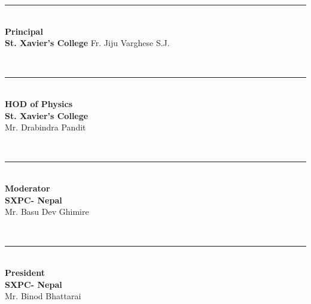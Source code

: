 \documentclass[a4paper,10pt]{article}
\begin{document}
\vspace{2.8cm}

\begin{center}

\begin{minipage}{0.2\textwidth}
\begin{flushleft}
\rule{3.3cm}{0.4pt} \\[0.5cm]
\textbf{Principal}\\
\textbf{St. Xavier's College}
Fr. Jiju Varghese S.J.
\end{flushleft}
\end{minipage}
~
\begin{minipage}{0.2\textwidth}
\begin{flushleft}
\rule{3.3cm}{0.4pt} \\[0.5cm]
\textbf{HOD of Physics}\\
\textbf{St. Xavier's College}\\
Mr. Drabindra Pandit
\end{flushleft}
\end{minipage}
~
\begin{minipage}{0.21\textwidth}
\begin{flushleft}
\rule{3.4cm}{0.4pt} \\[0.5cm]
\textbf{Moderator}\\
\textbf{SXPC- Nepal}\\
Mr. Basu Dev Ghimire
\end{flushleft}
\end{minipage}
~
\begin{minipage}{0.2\textwidth}
\begin{flushleft}
\rule{3cm}{0.4pt} \\[0.5cm]
\textbf{President}\\
\textbf{SXPC- Nepal}\\
Mr. Binod Bhattarai
\end{flushleft}
\end{minipage}

\end{center}
\end{document}
